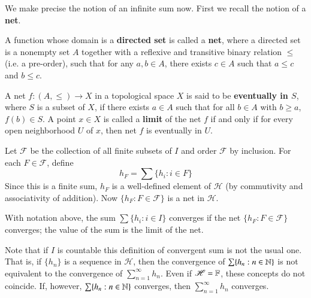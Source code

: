 We make precise the notion of an infinite sum now. First we recall the notion of a \textbf{net}.

\begin{defn}
    A function whose domain is a \textbf{directed set} is called a \textbf{net}, where a directed set is a nonempty set $A$ together with a reflexive and transitive binary relation $\leq$ (i.e. a pre-order), such that for any $a,b \in A$, there exists $c \in A$ such that $a\leq c$ and $b \leq c$. 

    A net $f:(A,\leq)\rightarrow X$ in a topological space $X$ is said to be \textbf{eventually in $S$}, where $S$ is a subset of $X$, if there exists $a \in A$ such that for all $b \in A$ with $b \geq a$, $f(b) \in S$. A point $x \in X$ is called a \textbf{limit} of the net $f$ if and only if for every open neighborhood $U$ of $x$, then net $f$ is eventually in $U$.
\end{defn}


Let $\mathscr{F}$ be the collection of all finite subsets of $I$ and order $\mathscr{F}$ by inclusion. For each $F \in \mathscr{F}$, define $$h_F = \sum\{h_i:i \in F\}$$
Since this is a finite sum, $h_F$ is a well-defined element of $\mathscr{H}$ (by commutivity and associativity of addition). Now $\{h_F:F \in \mathscr{F}\}$ is a net in $\mathscr{H}$.

\begin{defn}
    With notation above, the sum $\sum\{h_i:i \in I\}$ converges if the net $\{h_F:F \in \mathscr{F}\}$ converges; the value of the sum is the limit of the net.
\end{defn}

Note that if $I$ is countable this definition of convergent sum is not the usual one. That is, if $\{h_n\}$ is a sequence in $\mathscr{H}$, then the convergence of $\sum\{h_n:n\in\mathbb N\}$ is not equivalent to the convergence of $\sum_{n=1}^{\infty}h_n$. Even if $\mathscr{H} = \mathbb F$, these concepts do not coincide. If, however, $\sum\{h_n:n\in\mathbb N\}$ converges, then $\sum_{n=1}^{\infty}h_n$ converges.

